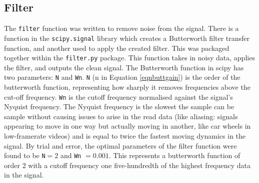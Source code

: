 \documentclass[twoside,a4]{report}
\def\br{\newline \newline \noindent}
\begin{document}
	\subsection*{Filter}
	The \texttt{filter} function was written to remove noise from the signal. There is a function in the \texttt{scipy.signal} library which creates a Butterworth filter transfer function, and another used to apply the created filter. This was packaged together within the \texttt{filter.py} package. This function takes in noisy data, applies the filter, and outputs the clean signal. 
	\br
	The Butterworth function in scipy has two parameters: \texttt{N} and \texttt{Wn}. \texttt{N} (n in Equation \ref{eqnbuttgain}) is the order of the butterworth function, representing how sharply it removes frequencies above the cut-off frequency. \texttt{Wn} is the cutoff frequency normalised against the signal's Nyquist frequency. The Nyquist frequency is the slowest the sample can be sample without causing issues to arise in the read data (like aliasing: signals appearing to move in one way but actually moving in another, like car wheels in low-framerate videos) and is equal to twice the fastest moving dynamics in the signal. By trial and error, the optimal parameters of the filter function were found to be \texttt{N}$ = 2$ and \texttt{Wn} $ = 0.001$. This represents a butterworth function of order 2 with a cutoff frequency one five-hundredth of the highest frequency data in the signal.
	
\end{document}
